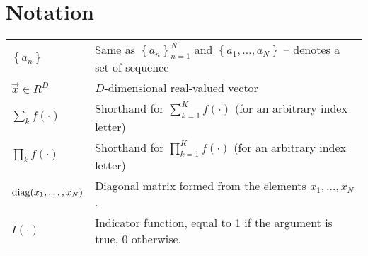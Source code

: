 \chapter{Notation}
\begin{tabular}{ll}
    $\left\{a_n\right\}$                & Same as $\left\{a_n\right\}_{n = 1}^N$ and $\left\{a_1, \dotsc, a_N\right\}$ -- denotes a set of sequence \\
    $\vec x \in R^D$                    & $D$-dimensional real-valued vector \\
    $\sum_k f(\cdot)$                   & Shorthand for $\sum_{k = 1}^K f(\cdot)$ (for an arbitrary index letter) \\
    $\prod_k f(\cdot)$                  & Shorthand for $\prod_{k = 1}^K f(\cdot)$ (for an arbitrary index letter) \\
    $\operatorname{diag}(x_1, \dotsc, x_N)$           & Diagonal matrix formed from the elements $x_1, \dotsc, x_N$. \\
    $I(\cdot)$							& Indicator function, equal to 1 if the argument is true, 0 otherwise.
\end{tabular}